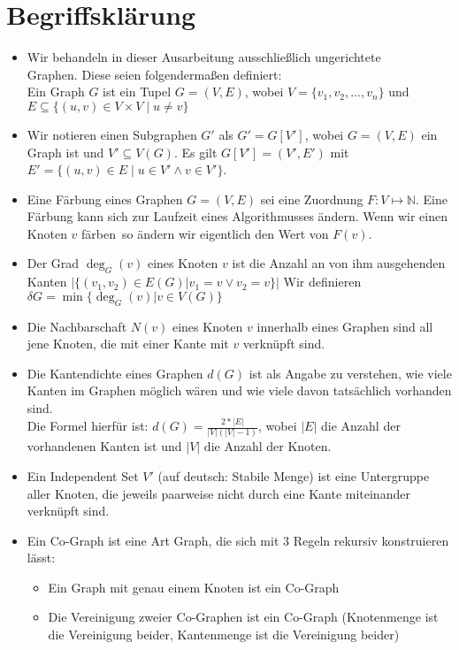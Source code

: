 \documentclass[11pt]{article}
\begin{document}
\section{Begriffsklärung} %
\begin{itemize}[noitemsep, left=0pt]
\item Wir behandeln in dieser Ausarbeitung ausschließlich ungerichtete \\Graphen.
Diese seien folgendermaßen definiert:\\
Ein Graph $G$ ist ein Tupel $G=(V,E)$, wobei $V=\{v_1,v_2,...,v_n\}$ und $E\subseteq \{(u,v)\in V\times V \mid u\neq v\}$
\item Wir notieren einen Subgraphen $G'$ als 
$G'=G[V']$,
wobei $G=(V,E)$ ein Graph ist und $V'\subseteq V(G)$.
Es gilt $G[V']=(V',E')$ mit $E'=\{(u,v)\in E\mid u\in V'\land v\in V'\}$.
\item Eine Färbung eines Graphen $G=(V,E)$ sei eine Zuordnung $F: V\mapsto \mathbb{N}$. Eine Färbung kann sich zur Laufzeit eines Algorithmusses ändern.
Wenn wir einen Knoten $v$ \grqq färben\grqq\ so ändern wir eigentlich den Wert von $F(v)$.
\item Der Grad $\deg_G(v)$ eines Knoten $v$ ist die Anzahl an von ihm ausgehenden Kanten $|\{(v_1,v_2)\in E(G) | v_1=v\lor v_2=v\}|$
Wir definieren $\delta G=\min\{\deg_G(v)|v\in V(G)\}$
\item Die Nachbarschaft $N(v)$ eines Knoten $v$ innerhalb eines Graphen sind all jene Knoten,
die mit einer Kante mit $v$ verknüpft sind.
\item Die Kantendichte eines Graphen $d(G)$ ist als Angabe zu verstehen, wie viele Kanten im Graphen möglich wären und wie viele davon tatsächlich vorhanden sind. \\
Die Formel hierfür ist: $d(G) = \frac{2*|E|}{|V|(|V|-1)}$, wobei $|E|$ die Anzahl der vorhandenen Kanten ist und $|V|$ die Anzahl der Knoten. \\
\item Ein Independent Set $V'$ (auf deutsch: Stabile Menge) ist eine Untergruppe aller Knoten, die jeweils paarweise nicht durch eine
Kante miteinander verknüpft sind.
\item Ein Co-Graph ist eine Art Graph, die sich mit $3$ Regeln rekursiv konstruieren lässt: \\
\begin{itemize}
  \item Ein Graph mit genau einem Knoten ist ein Co-Graph
  \item Die Vereinigung zweier Co-Graphen ist ein Co-Graph (Knotenmenge ist die Vereinigung beider, Kantenmenge ist die Vereinigung beider)

\end{itemize}
\end{itemize}
\end{document}
